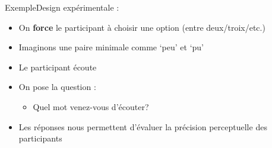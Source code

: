 \documentclass[xcolor=dvipsnames, mathserif, 10pt, aspectratio=169, handout]{beamer}
\begin{document}




\begin{frame}{Exemple}{Design expérimentale : }

\begin{itemize}
	\item On \textbf{force} le participant à choisir une option (entre deux/troix/etc.)

\pause
	\item Imaginons une paire minimale comme `peu'  et `pu' 

\pause
	\item Le participant écoute 
	\item[\winner] On pose la question :
	
	\begin{itemize}
		\item Quel mot venez-vous d'écouter?  
	\end{itemize}


	\item Les réponses nous permettent d'évaluer la précision perceptuelle des participants
	
\end{itemize}
	
\end{frame}

\end{document}
